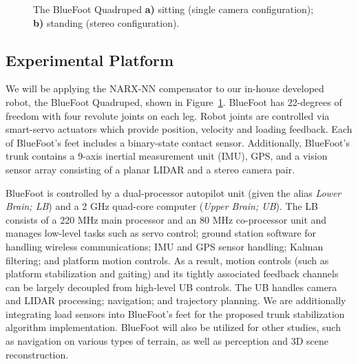 
	\begin{figure}[t!]\centering
		\begin{subfigure}{0.475\textwidth}
			\centering
			\caption{ }
		\end{subfigure}
		\begin{subfigure}{0.475\textwidth}
			\centering
			\caption{ }
		\end{subfigure}
		\caption{ The BlueFoot Quadruped \textbf{a)} sitting (single camera configuration); \SSep \textbf{b)} standing (stereo configuration).}
		\label{fig::bluefoot}
		\PostImageCloseSpace
	\end{figure}
\subsection{Experimental Platform}

We will be applying the NARX-NN compensator to our in-house developed robot, the BlueFoot Quadruped, shown in
Figure~\ref{fig::bluefoot}. BlueFoot has 22-degrees of freedom with four revolute joints on each leg.
Robot joints are controlled via smart-servo actuators which provide position, velocity and
loading feedback. Each of BlueFoot's feet includes a binary-state contact sensor.
Additionally, BlueFoot's trunk contains a 9-axis inertial measurement unit (IMU), GPS, 
and a vision sensor array consisting of a planar LIDAR and a stereo camera pair.

BlueFoot is controlled by a dual-processor autopilot unit (given the alias \emph{Lower Brain; LB}) 
and a 2 GHz  quad-core computer (\emph{Upper Brain; UB}). The LB consists of a 220 MHz main processor 
and an 80 MHz co-processor  unit and manages low-level tasks such as servo 
control;  ground station software for handling wireless communications; IMU and GPS sensor handling; Kalman filtering;
and platform motion controls. As a result, motion controls (such as platform stabilization and gaiting) and its tightly 
associated feedback channels can be largely decoupled from high-level UB controls. The UB handles camera and LIDAR 
processing; navigation; and trajectory planning.
We are additionally integrating load sensors into BlueFoot's feet for the proposed trunk stabilization
algorithm implementation. BlueFoot will also be utilized for other studies, such as navigation on
various types of terrain, as well as perception and 3D scene reconstruction.

